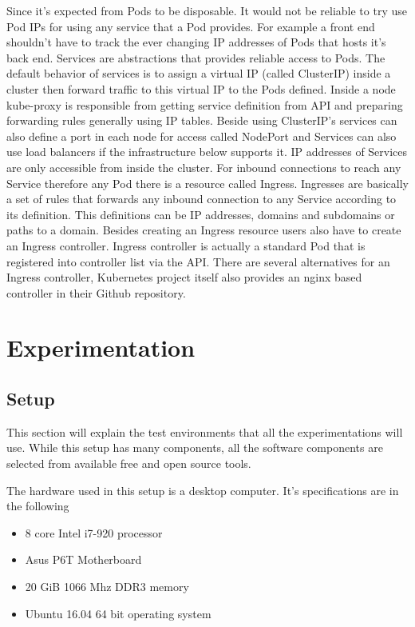 \documentclass[12pt,oneandhalf,chaparabic,ceng,ms,eng,oneside,pntc]{gsufbe}
\begin{document}
Since it’s expected from Pods to be disposable. It would not be reliable to try use Pod IPs for using
any service that a Pod provides. For example a front end shouldn’t have to track the ever changing IP
addresses of Pods that hosts it’s back end. Services are abstractions that provides reliable access to
Pods. The default behavior of services is to assign a virtual IP (called ClusterIP) inside a cluster
then forward traffic to this virtual IP to the Pods defined. Inside a node kube-proxy is responsible
from getting service definition from API and preparing forwarding rules generally using IP tables.
Beside using ClusterIP’s services can also define a port in each node for access called NodePort and
Services can also use load balancers if the infrastructure below supports it.
IP addresses of Services are only accessible from inside the cluster. For inbound connections to reach
any Service therefore any Pod there is a resource called Ingress. Ingresses are basically a set of rules
that forwards any inbound connection to any Service according to its definition. This definitions can
be IP addresses, domains and subdomains or paths to a domain. Besides creating an Ingress resource
users also have to create an Ingress controller. Ingress controller is actually a standard Pod that is
registered into controller list via the API. There are several alternatives for an Ingress controller,
Kubernetes project itself also provides an nginx based controller in their Github repository.


\chapter{Experimentation}
\section{Setup}
This section will explain the test environments that all the experimentations will use. While this
setup has many components, all the software components are selected from available free and open source
tools.

The hardware used in this setup is a desktop computer. It's specifications are in the following
\begin{itemize}
 \item 8 core Intel i7-920 processor
 \item Asus P6T Motherboard
 \item 20 GiB 1066 Mhz DDR3 memory
 \item Ubuntu 16.04 64 bit operating system
\end{itemize}
\end{document}
